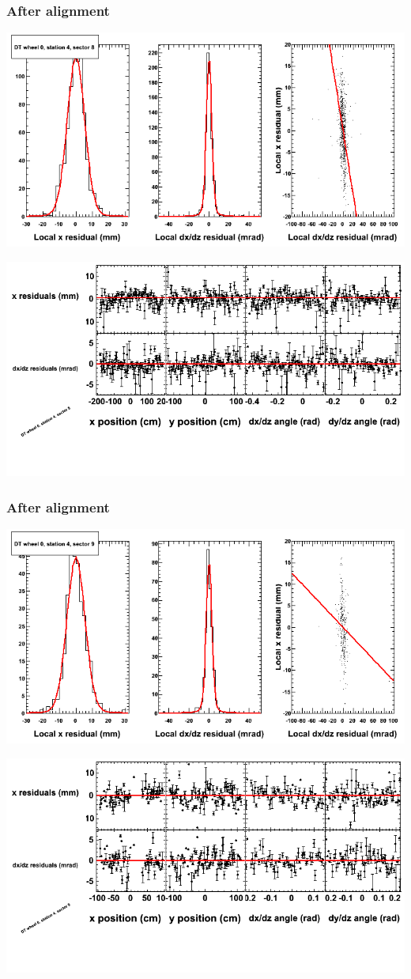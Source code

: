 \documentclass[compress]{beamer}
\begin{document}
\begin{frame}
\frametitle{After alignment}
\includegraphics[width=0.7\linewidth]{NOV4_fitfunctions/MBwhCst4sec08_bellcurves.png}

\includegraphics[width=0.7\linewidth]{NOV4_fitfunctions/MBwhCst4sec08_polynomials.png}
\end{frame}

\begin{frame}
\frametitle{After alignment}
\includegraphics[width=0.7\linewidth]{NOV4_fitfunctions/MBwhCst4sec09_bellcurves.png}

\includegraphics[width=0.7\linewidth]{NOV4_fitfunctions/MBwhCst4sec09_polynomials.png}
\end{frame}
\end{document}
